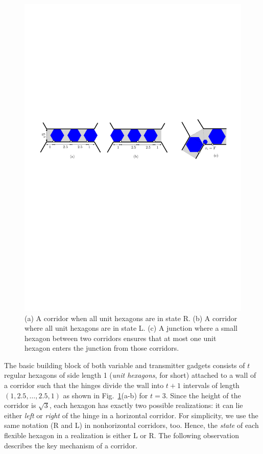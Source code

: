 \documentclass{article}
\theoremstyle{plain}%
\begin{document}
\begin{figure}[htbp]
	\centering
	\includegraphics[width=0.9\columnwidth]{fig-variable-hex+}
	\caption{(a) A corridor when all unit hexagons are in state R.
(b) A corridor where all unit hexagons are in state L.
(c) A junction where a small hexagon between two corridors
    ensures that at most one unit hexagon enters the junction from those corridors.}
	\label{fig:variable}
\end{figure}

The basic building block of both variable and transmitter gadgets consists of $t$ regular hexagons of side length 1 (\emph{unit hexagons}, for short) attached to a wall of a corridor such that the hinges divide the wall into $t+1$ intervals of length $(1,2.5,\ldots ,2.5,1)$ as shown in Fig.~\ref{fig:variable}(a-b) for $t=3$. Since the height of the corridor is $\sqrt{3}$, each hexagon has exactly two possible realizations: it can lie either \emph{left} or \emph{right} of the hinge in a horizontal corridor. For simplicity, we use the same notation (R and L) in nonhorizontal corridors, too. Hence, the \emph{state} of each flexible hexagon in a realization is either L or R. The following observation describes the key mechanism of a corridor.
\end{document}
